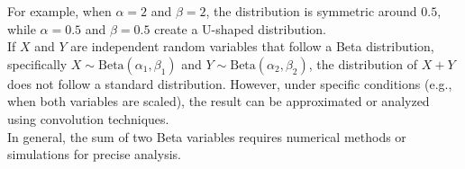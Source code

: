 \begin{center}
\end{center}

For example, when \(\alpha = 2\) and \(\beta = 2\), the distribution is symmetric around \(0.5\), while \(\alpha = 0.5\) and \(\beta = 0.5\) create a U-shaped distribution.\\

If \(X\) and \(Y\) are independent random variables that follow a Beta distribution, specifically \(X \sim \text{Beta}(\alpha_1, \beta_1)\) and \(Y \sim \text{Beta}(\alpha_2, \beta_2)\), the distribution of \(X + Y\) does not follow a standard distribution. However, under specific conditions (e.g., when both variables are scaled), the result can be approximated or analyzed using convolution techniques.\\

In general, the sum of two Beta variables requires numerical methods or simulations for precise analysis.


